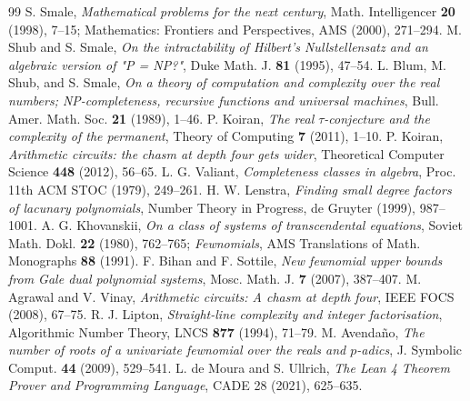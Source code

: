\documentclass[11pt,a4paper]{article}
\theoremstyle{definition}
\begin{document}
\begin{thebibliography}{99}
 S. Smale, \textit{Mathematical problems for the next century}, Math. Intelligencer \textbf{20} (1998), 7--15; Mathematics: Frontiers and Perspectives, AMS (2000), 271--294.
 M. Shub and S. Smale, \textit{On the intractability of Hilbert's Nullstellensatz and an algebraic version of "P = NP?"}, Duke Math. J. \textbf{81} (1995), 47--54.
 L. Blum, M. Shub, and S. Smale, \textit{On a theory of computation and complexity over the real numbers; NP-completeness, recursive functions and universal machines}, Bull. Amer. Math. Soc. \textbf{21} (1989), 1--46.
 P. Koiran, \textit{The real $\tau$-conjecture and the complexity of the permanent}, Theory of Computing \textbf{7} (2011), 1--10.
 P. Koiran, \textit{Arithmetic circuits: the chasm at depth four gets wider}, Theoretical Computer Science \textbf{448} (2012), 56--65.
 L. G. Valiant, \textit{Completeness classes in algebra}, Proc. 11th ACM STOC (1979), 249--261.
 H. W. Lenstra, \textit{Finding small degree factors of lacunary polynomials}, Number Theory in Progress, de Gruyter (1999), 987--1001.
 A. G. Khovanskii, \textit{On a class of systems of transcendental equations}, Soviet Math. Dokl. \textbf{22} (1980), 762--765; \textit{Fewnomials}, AMS Translations of Math. Monographs \textbf{88} (1991).
 F. Bihan and F. Sottile, \textit{New fewnomial upper bounds from Gale dual polynomial systems}, Mosc. Math. J. \textbf{7} (2007), 387--407.
 M. Agrawal and V. Vinay, \textit{Arithmetic circuits: A chasm at depth four}, IEEE FOCS (2008), 67--75.
 R. J. Lipton, \textit{Straight-line complexity and integer factorisation}, Algorithmic Number Theory, LNCS \textbf{877} (1994), 71--79.
 M. Avendaño, \textit{The number of roots of a univariate fewnomial over the reals and $p$-adics}, J. Symbolic Comput. \textbf{44} (2009), 529--541.
 L. de Moura and S. Ullrich, \textit{The Lean 4 Theorem Prover and Programming Language}, CADE 28 (2021), 625--635.
\end{thebibliography}
\end{document}
